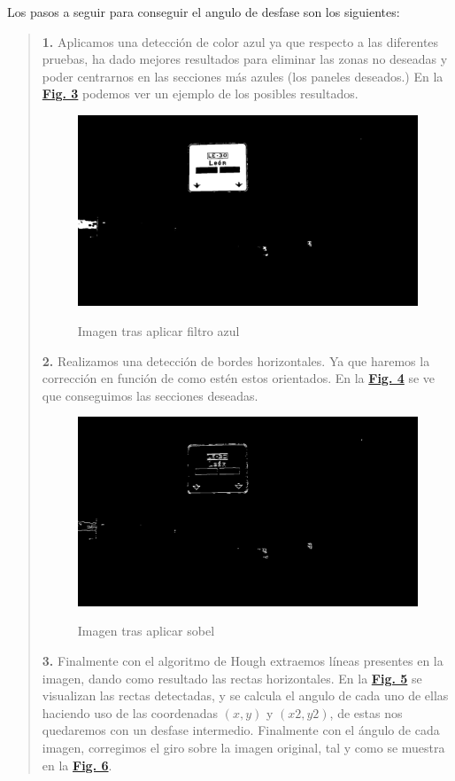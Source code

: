 \documentclass[a4paper, 12pt]{article}
\begin{document}
Los pasos a seguir para conseguir el angulo de desfase son los siguientes:



\begin{quote}
	\textbf{1.} Aplicamos una detección de color azul ya que respecto a las diferentes pruebas, ha dado mejores resultados para eliminar las zonas no deseadas y poder centrarnos en las secciones más azules (los paneles deseados.) En la \textbf{\hyperref[fig:imagebluef]{Fig. 3}} podemos ver un ejemplo de los posibles resultados.
	\begin{figure}[h]
		\centering
		\caption{Imagen tras aplicar filtro azul}\vspace{0.5cm}
		\includegraphics[width=0.6\linewidth]{img/image_blue_f}
		\label{fig:imagebluef}
	\end{figure}
	
	\textbf{2.} Realizamos una detección de bordes horizontales. Ya que haremos la corrección en función de como estén estos orientados. En la \textbf{\hyperref[fig:imageboderh]{Fig. 4}} se ve que conseguimos las secciones deseadas.
	
	\begin{figure}[h]
		\centering
		\caption{Imagen tras aplicar sobel}\vspace{0.5cm}
		\includegraphics[width=0.6\linewidth]{img/image_boder_h}
		\label{fig:imageboderh}
	\end{figure}
	\textbf{3.} Finalmente con el algoritmo de Hough extraemos líneas presentes en la imagen, dando como resultado las rectas horizontales. En la \textbf{\hyperref[fig:imagewithlines]{Fig. 5}} se visualizan las rectas detectadas, y se calcula el angulo de cada uno de ellas haciendo uso de las coordenadas $(x, y)$ y $(x2, y2)$, de estas nos quedaremos con un desfase intermedio. Finalmente con el ángulo de cada imagen, corregimos el giro sobre la imagen original, tal y como se muestra en la \textbf{\hyperref[fig:00057co]{Fig. 6}}.
	

\end{quote}
\end{document}
